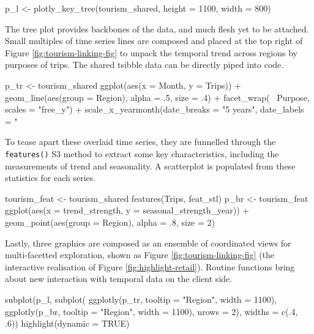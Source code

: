 \begin{Schunk}
\begin{Sinput}
p_l <- plotly_key_tree(tourism_shared, height = 1100, width = 800)
\end{Sinput}
\end{Schunk}

The tree plot provides backbones of the data, and much flesh yet to be
attached. Small multiples of time series lines are composed and placed
at the top right of Figure \ref{fig:tourism-linking-fig} to unpack the
temporal trend across regions by purposes of trips. The shared tsibble
data can be directly piped into  code.

\begin{Schunk}
\begin{Sinput}
p_tr <- tourism_shared %
  ggplot(aes(x = Month, y = Trips)) +
  geom_line(aes(group = Region), alpha = .5, size = .4) +
  facet_wrap(~ Purpose, scales = "free_y") +
  scale_x_yearmonth(date_breaks = "5 years", date_labels = "%
\end{Sinput}
\end{Schunk}

To tease apart these overlaid time series, they are funnelled through
the \texttt{features()} S3 method to extract some key characteristics,
including the measurements of trend and seasonality. A scatterplot is
populated from these statistics for each series.

\begin{Schunk}
\begin{Sinput}
tourism_feat <- tourism_shared %
  features(Trips, feat_stl)
p_br <- tourism_feat %
  ggplot(aes(x = trend_strength, y = seasonal_strength_year)) +
  geom_point(aes(group = Region), alpha = .8, size = 2)
\end{Sinput}
\end{Schunk}

Lastly, three graphics are composed as an ensemble of coordinated views
for multi-facetted exploration, shown as Figure
\ref{fig:tourism-linking-fig} (the interactive realisation of Figure
\ref{fig:highlight-retail}). Routine functions bring about new
interaction with temporal data on the client side.

\begin{Schunk}
\begin{Sinput}
subplot(p_l,
  subplot(
    ggplotly(p_tr, tooltip = "Region", width = 1100),
    ggplotly(p_br, tooltip = "Region", width = 1100),
    nrows = 2),
  widths = c(.4, .6)) %
  highlight(dynamic = TRUE)
\end{Sinput}
\end{Schunk}

